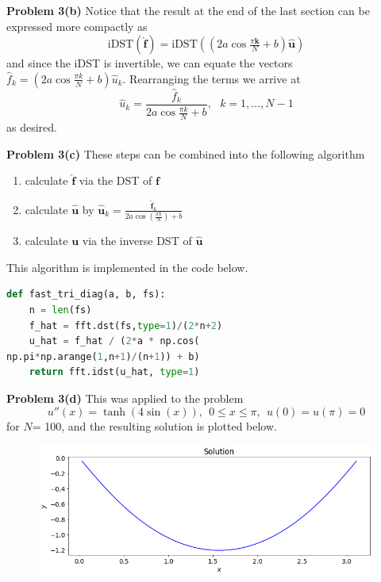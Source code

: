 \documentclass[12pt]{article}
\newcommand{\problem}[1]{\hspace{-4 ex} \large \textbf{Problem #1} }
\renewcommand{\vec}[1]{\boldsymbol{\mathbf{#1}}}
\begin{document}
\bigbreak

\problem{3(b)} Notice that the result at the end of the last section can be expressed more compactly as
$$
\text{iDST}(\hat{\vec{f}}) = \text{iDST}\left( \left(2a\cos \tfrac{\pi \vec{k}}{N} +b\right) \hat{\vec{u}} \right)
$$
and since the iDST is invertible, we can equate the vectors $\hat{f}_k = \left(2a\cos \tfrac{\pi k}{N} +b\right) \hat{u}_k$. Rearranging the terms we arrive at
$$
\hat{u}_k = \frac{\hat{f}_k}{2a\cos \tfrac{\pi k}{N} +b}, \ \ \ k=1,\dots, N-1
$$
as desired.

\bigbreak
\problem{3(c)} These steps can be combined into the following algorithm
\begin{enumerate}
	\item calculate $\hat{\vec{f}}$ via the DST of $\vec{f}$
	\item calculate $\hat{\vec{u}}$ by $\hat{\vec{u}}_k = \frac{\hat{\vec{f}}_k}{2a \cos \left(\frac{\pi k}{N} \right) + b}$
	\item calculate $\vec{u}$ via the inverse DST of $\hat{\vec{u}}$
\end{enumerate}
This algorithm is implemented in the code below.
\begin{lstlisting}[language=Python]
def fast_tri_diag(a, b, fs):
	n = len(fs)
	f_hat = fft.dst(fs,type=1)/(2*n+2)
	u_hat = f_hat / (2*a * np.cos(
np.pi*np.arange(1,n+1)/(n+1)) + b)
	return fft.idst(u_hat, type=1)
\end{lstlisting}

\bigbreak

\problem{3(d)} This was applied to the problem
$$
u''(x) = \tanh(4\sin(x)), \ \ 0 \leq x \leq \pi, \ \  u(0)=u(\pi) = 0
$$
for $N$= 100, and the resulting solution is plotted below.
\begin{figure}[H]
	\includegraphics[width=1\textwidth]{hw02_p3d_plot}
	\centering
\end{figure}
\end{document}
